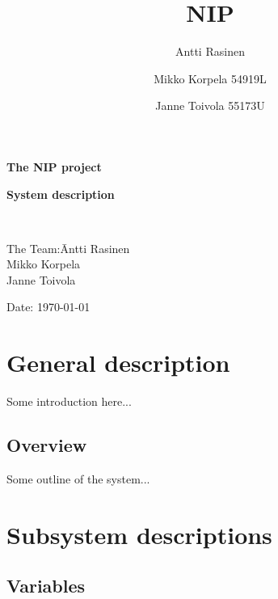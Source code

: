 \documentclass[12pt,a4paper]{report}
\title{NIP}
\author{Antti Rasinen}
\author{Mikko Korpela 54919L}
\author{Janne Toivola 55173U}
\begin{document}
\pagestyle{empty}
\setlength{\parindent}{0mm}
\setlength{\parskip}{3mm}

\large
\textbf{The NIP project}\\

\vspace{45mm}

\begin{centering}
\huge
\textbf{System description}\\ %
\end{centering}

\parbox{5cm}{\ }
\parbox{1em}{\vskip8cm}

\normalsize
\vspace{5mm}
\begin{tabbing}
The Team:\= Antti Rasinen\\
         \> Mikko Korpela\\
         \> Janne Toivola\\
\vspace{5mm}

\end{tabbing}
Date: \today
\eject\newpage

\pagestyle{plain}

\tableofcontents

%




\newpage
\chapter{General description}

Some introduction here...

\section{Overview}

Some outline of the system...

\newpage
\chapter{Subsystem descriptions}
\section{Variables}
\end{document}
